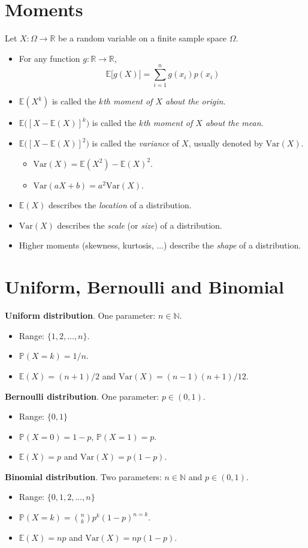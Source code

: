 \documentclass[lecture]{csm}
\newcommand{\prob}{\mathbb{P}}
\newcommand{\expe}{\mathbb{E}}
\newcommand{\var}{\text{Var}}
\newcommand{\N}{\mathbb{N}}
\newcommand{\R}{\mathbb{R}}
\def\it{\item}
\def\bit{\begin{itemize}}
\def\eit{\end{itemize}}
\begin{document}
\section{Moments}
Let $X:\Omega\to\R$ be a random variable on a finite sample space $\Omega$.
\bit
\it For any function $g:\R\to\R$, 
\[
\expe\big[g(X)\big] = \sum_{i=1}^n g(x_i)p(x_i)
\]
\it $\expe(X^k)$ is called the \emph{$k$th moment of $X$ about the origin}.
\it $\expe\big([X-\expe(X)]^k\big)$ is called the \emph{$k$th moment of $X$ about the mean}.
\it $\expe\big([X-\expe(X)]^2\big)$ is called the \emph{variance} of $X$, usually denoted by $\var(X)$.
\bit
\it $\var(X) = \expe(X^2) - \expe(X)^2$.
\it $\var(aX + b) = a^2\var(X)$.
\eit
\it $\expe(X)$ describes the \emph{location} of a distribution.
\it $\var(X)$ describes the \emph{scale} (or \emph{size}) of a distribution.
\it Higher moments (skewness, kurtosis, ...) describe the \emph{shape} of a distribution.
\eit
\newpage
\section{Uniform, Bernoulli and Binomial}
\textbf{Uniform distribution}. One parameter: $n\in\N$.
\bit
\it Range: $\{1,2,\ldots,n\}$.
\it $\prob(X=k) = 1/n$.
\it $\expe(X) = (n+1)/2$ and $\var(X) = (n-1)(n+1)/12$.
\eit
\vspace*{2ex}
\textbf{Bernoulli distribution}. One parameter: $p\in(0,1)$.
\bit
\it Range: $\{0,1\}$
\it $\prob(X=0) = 1-p$, $\prob(X=1) = p$.
\it $\expe(X) = p$ and $\var(X) = p(1-p)$.
\eit
\vspace*{2ex}
\textbf{Binomial distribution}. Two parameters: $n\in\N$ and $p\in(0,1)$.
\bit
\it Range: $\{0,1,2,\ldots,n\}$
\it $\prob(X=k) = \binom{n}{k}p^k(1-p)^{n=k}$.
\it $\expe(X) = np$ and $\var(X) = np(1-p)$.
\eit

\end{document}
